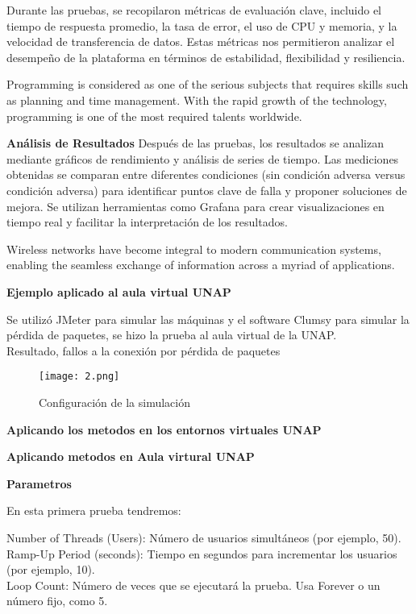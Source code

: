 \documentclass{article}
\begin{document}
Durante las pruebas, se recopilaron métricas de evaluación clave, incluido el tiempo de respuesta promedio, la tasa de error, el uso de CPU y memoria, y la velocidad de transferencia de datos. Estas métricas nos permitieron analizar el desempeño de la plataforma en términos de estabilidad, flexibilidad y resiliencia.

Programming is considered as one of the serious subjects that requires skills such as planning and time management. With the rapid growth of the technology, programming is one of the most required talents worldwide.\parencite{Dzulkifly2025178} 

\textbf{Análisis de Resultados}
Después de las pruebas, los resultados se analizan mediante gráficos de rendimiento y análisis de series de tiempo. Las mediciones obtenidas se comparan entre diferentes condiciones (sin condición adversa versus condición adversa) para identificar puntos clave de falla y proponer soluciones de mejora. Se utilizan herramientas como Grafana para crear visualizaciones en tiempo real y facilitar la interpretación de los resultados.

Wireless networks have become integral to modern communication systems, enabling the seamless exchange of information across a myriad of applications. \parencite{Zou2024}

\textbf{Ejemplo aplicado al aula virtual UNAP}

Se utilizó JMeter para simular las máquinas y el software Clumsy para simular la pérdida de paquetes, se hizo la prueba al aula virtual de la UNAP.\\

Resultado, fallos a la conexión por pérdida de paquetes

\begin{figure}[H]
    \centering
    \texttt{[image: 2.png]}
    \caption{Configuración de la simulación}
    \label{fig:enter-label}
\end{figure}

\textbf{Aplicando los metodos en los entornos virtuales UNAP}

\textbf{Aplicando metodos en Aula virtural UNAP}

\textbf{Parametros}

En esta primera prueba tendremos:

Number of Threads (Users): Número de usuarios simultáneos (por ejemplo, 50).\\
Ramp-Up Period (seconds): Tiempo en segundos para incrementar los usuarios (por ejemplo, 10).\\
Loop Count: Número de veces que se ejecutará la prueba. Usa Forever o un número fijo, como 5.\\
\end{document}
